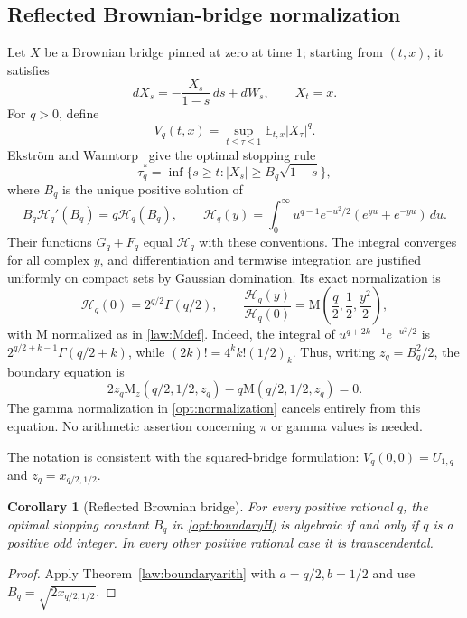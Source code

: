 \documentclass[11pt,a4paper]{article}
\newcommand{\M}{\mathrm M}
\newtheorem{corollary}[theorem]{Corollary}
\theoremstyle{definition}
\theoremstyle{remark}
\numberwithin{equation}{section}
\begin{document}
\subsection{Reflected Brownian-bridge normalization}

Let $X$ be a Brownian bridge pinned at zero at time $1$; starting from
$(t,x)$, it satisfies
\[
 dX_s=-\frac{X_s}{1-s}\,ds+dW_s,\qquad X_t=x.
\]
For $q>0$, define
\[
 V_q(t,x)=\sup_{t\leq\tau\leq1}\mathbb E_{t,x}|X_\tau|^q.
\]
Ekstr\"om and Wanntorp~\cite[Theorem 3.2 and equation (3.8)]{EW}
give the optimal stopping rule
\[
 \tau_q^*=\inf\{s\geq t:|X_s|\geq B_q\sqrt{1-s}\},
\]
where $B_q$ is the unique positive solution of
\begin{equation}\label{opt:boundaryH}
 B_q \mathcal{H}_q'(B_q)=q\mathcal{H}_q(B_q),\qquad
 \mathcal{H}_q(y)=\int_0^\infty u^{q-1}e^{-u^2/2}
       (e^{yu}+e^{-yu})\,du.
\end{equation}
Their functions $G_q+F_q$ equal $\mathcal{H}_q$ with these conventions.
The integral converges for all complex $y$, and differentiation and
termwise integration are justified uniformly on compact sets by Gaussian
domination. Its exact normalization is
\begin{equation}\label{opt:normalization}
 \mathcal{H}_q(0)=2^{q/2}\Gamma(q/2),\qquad
 \frac{\mathcal{H}_q(y)}{\mathcal{H}_q(0)}
 =\M\left(\frac q2,\frac12,\frac{y^2}{2}\right),
\end{equation}
with $\M$ normalized as in \eqref{law:Mdef}. Indeed, the integral of $u^{q+2k-1}e^{-u^2/2}$ is
$2^{q/2+k-1}\Gamma(q/2+k)$, while
$(2k)!=4^k k!(1/2)_k$.
Thus, writing $z_q=B_q^2/2$, the boundary equation is
\begin{equation}\label{opt:boundaryM}
 2z_q\M_z(q/2,1/2,z_q)-q\M(q/2,1/2,z_q)=0.
\end{equation}
The gamma normalization in \eqref{opt:normalization} cancels entirely from
this equation. No arithmetic assertion concerning $\pi$ or gamma values
is needed.


The notation is consistent with the squared-bridge formulation:
$V_q(0,0)=U_{1,q}$ and $z_q=x_{q/2,1/2}$.

\begin{corollary}[Reflected Brownian bridge]\label{opt:brownian}
For every positive rational $q$, the optimal stopping constant $B_q$
in \eqref{opt:boundaryH} is algebraic if and only if $q$ is a positive odd
integer. In every other positive rational case it is transcendental.
\end{corollary}
\begin{proof}
Apply Theorem~\ref{law:boundaryarith} with $a=q/2,b=1/2$ and use
$B_q=\sqrt{2x_{q/2,1/2}}$.
\end{proof}
\end{document}
